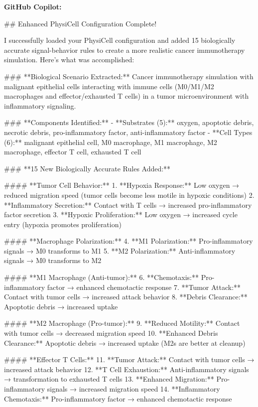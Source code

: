 \documentclass[11pt,a4paper]{article}
\begin{document}
\begin{copilotbox}
\textbf{GitHub Copilot:}

\#\# Enhanced PhysiCell Configuration Complete!

I successfully loaded your PhysiCell configuration and added 15 biologically accurate signal-behavior rules to create a more realistic cancer immunotherapy simulation. Here's what was accomplished:

\#\#\# **Biological Scenario Extracted:**
Cancer immunotherapy simulation with malignant epithelial cells interacting with immune cells (M0/M1/M2 macrophages and effector/exhausted T cells) in a tumor microenvironment with inflammatory signaling.

\#\#\# **Components Identified:**
- **Substrates (5):** oxygen, apoptotic debris, necrotic debris, pro-inflammatory factor, anti-inflammatory factor
- **Cell Types (6):** malignant epithelial cell, M0 macrophage, M1 macrophage, M2 macrophage, effector T cell, exhausted T cell

\#\#\# **15 New Biologically Accurate Rules Added:**

\#\#\#\# **Tumor Cell Behavior:**
1. **Hypoxia Response:** Low oxygen → reduced migration speed (tumor cells become less motile in hypoxic conditions)
2. **Inflammatory Secretion:** Contact with T cells → increased pro-inflammatory factor secretion
3. **Hypoxic Proliferation:** Low oxygen → increased cycle entry (hypoxia promotes proliferation)

\#\#\#\# **Macrophage Polarization:**
4. **M1 Polarization:** Pro-inflammatory signals → M0 transforms to M1 
5. **M2 Polarization:** Anti-inflammatory signals → M0 transforms to M2

\#\#\#\# **M1 Macrophage (Anti-tumor):**
6. **Chemotaxis:** Pro-inflammatory factor → enhanced chemotactic response
7. **Tumor Attack:** Contact with tumor cells → increased attack behavior
8. **Debris Clearance:** Apoptotic debris → increased uptake

\#\#\#\# **M2 Macrophage (Pro-tumor):**
9. **Reduced Motility:** Contact with tumor cells → decreased migration speed
10. **Enhanced Debris Clearance:** Apoptotic debris → increased uptake (M2s are better at cleanup)

\#\#\#\# **Effector T Cells:**
11. **Tumor Attack:** Contact with tumor cells → increased attack behavior  
12. **T Cell Exhaustion:** Anti-inflammatory signals → transformation to exhausted T cells
13. **Enhanced Migration:** Pro-inflammatory signals → increased migration speed
14. **Inflammatory Chemotaxis:** Pro-inflammatory factor → enhanced chemotactic response


\end{copilotbox}
\end{document}
